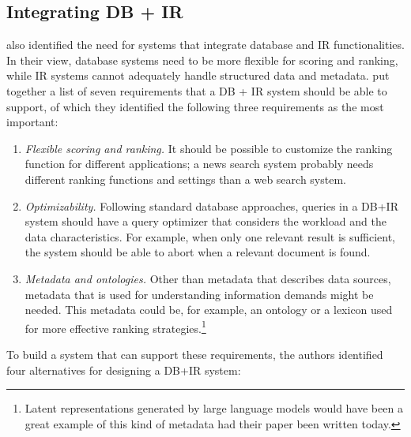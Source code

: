 \subsection{Integrating DB + IR}
 also identified the need for systems that integrate database and IR functionalities. In their view, database systems need to be more flexible for scoring and ranking, while IR systems cannot adequately handle structured data and metadata.  put together a list of seven requirements that a DB + IR system should be able to support, of which they identified the following three requirements as the most important:
\begin{enumerate}
	\item \emph{Flexible scoring and ranking.}
	It should be possible to customize the ranking function for different applications; a news search system probably needs different ranking functions and settings than a web search system. 
	\item \emph{Optimizability.}
	Following standard database approaches, queries in a DB+IR system should have a query optimizer that considers the workload and the data characteristics. For example, when only one relevant result is sufficient, the system should be able to abort when a relevant document is found. 
	\item \emph{Metadata and ontologies.}
	Other than metadata that describes data sources, metadata that is used for understanding information demands might be needed. This metadata could be, for example, an ontology or a lexicon used for more effective ranking strategies.\footnote{Latent representations generated by large language models would have been a great example of this kind of metadata had their paper been written today.}
\end{enumerate}
To build a system that can support these requirements, the authors identified four alternatives for designing a DB+IR system:

